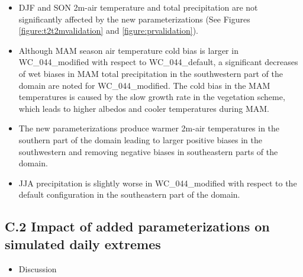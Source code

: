 \documentclass[a0b,landscape]{a0poster}
\begin{document}
\begin{multicols*}{4}
\begin{itemize}
  \item DJF and SON 2m-air temperature and total precipitation are not significantly
  affected by the new parameterizations (See Figures \ref{figure:t2t2mvalidation} and \ref{figure:prvalidation}).
  \item Although MAM season air temperature cold bias is larger in WC\_044\_modified with respect to WC\_044\_default,
  a significant decreases of wet biases in MAM total precipitation in the southwestern part of the domain are noted for  WC\_044\_modified.
  The cold bias in the MAM temperatures is caused by the slow growth rate in the vegetation scheme, which leads to higher albedos and cooler temperatures during MAM.
  \item The new parameterizations produce warmer 2m-air temperatures in the southern part
  of the domain leading to larger positive biases in the southwestern and removing negative biases in
  southeastern parts of the domain.
  \item JJA precipitation is slightly worse in WC\_044\_modified with respect to
  the default configuration in the southeastern part of the domain. 
\end{itemize}


\subsection*{C.2 Impact of added parameterizations on simulated daily extremes}


\begin{itemize}
    \item Discussion

\end{itemize}


%
\hfill
%


\end{multicols*}
\end{document}
